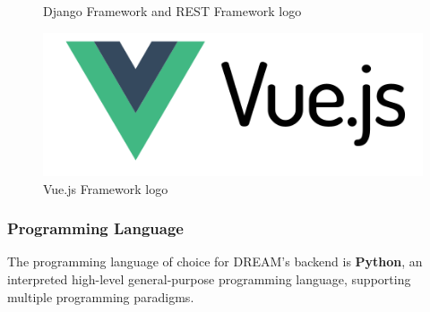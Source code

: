\documentclass[table, 12pt]{article}
\begin{document}
\begin{figure}[H]
    \qquad
    \caption{Django Framework and REST Framework logo}
\end{figure}
\begin{center}
    \begin{figure}[H]
        \includegraphics[scale=0.65, center]{assets/Vue-Logo.png}
        \caption{Vue.js Framework logo}
        \label{fig: vue_logo}
    \end{figure}
\end{center}

\subsubsection{Programming Language}
The programming language of choice for DREAM's backend is \textbf{Python}, an interpreted high-level general-purpose programming language, supporting multiple programming paradigms.
\end{document}
